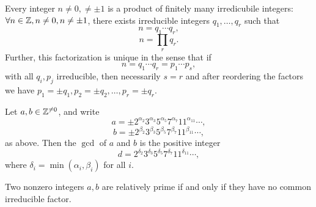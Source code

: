 \documentclass[../Aluffi_Algebra.tex]{subfiles}
\begin{document}
\begin{thm}
    Every integer \(n \neq 0, \neq \pm 1\) is a product of finitely many irredicubile integers: \(\forall n \in \mathbb{Z}, n
    \neq 0, n \neq \pm 1\), there exists irreducible integers \(q_1, \ldots, q_r\) such that
    \[ n = q_1 \cdots q_r, \]
    \[ n = \prod_r q_r. \]
    Further, this factorization is unique in the sense that if
    \[ n = q_1 \cdots q_r = p_1 \cdots p_s, \]
    with all \(q_i, p_j\) irreducible, then necessarily \(s = r\) and after reordering the factors we have 
    \(p_1 = \pm q_1, p_2 = \pm q_2, \ldots, p_r = \pm q_r\).
\end{thm}


\begin{prop}
    Let \(a, b \in \mathbb{Z}^{\neq 0}\), and write
    \[a = \pm 2^{\alpha_2} 3^{\alpha_3} 5^{\alpha_5} 7^{\alpha_7} 11^{\alpha_{11} }\cdots,\]
    \[b = \pm 2^{\beta_2}  3^{\beta_3}  5^{\beta_5}  7^{\beta_7}  11^{\beta_{11} }\cdots,\]
    as above. Then the \(\gcd\) of \(a\) and \(b\) is the positive integer
    \[d = 2^{\delta_2} 3^{\delta_3} 5^{\delta_5} 7^{\delta_7} 11^{\delta_11}\cdots,\]
    where \(\delta_i = \min(\alpha_i,\beta_i)\) for all \(i\).
\end{prop}


\begin{cor}
    Two nonzero integers \(a, b\) are relatively prime if and only if they have no common irreducible factor.
\end{cor}
\end{document}
